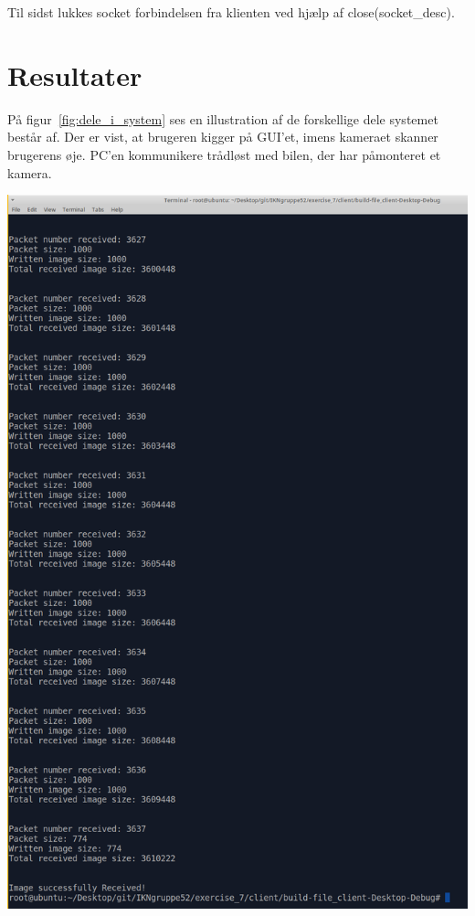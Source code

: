 \documentclass[12pt,fleqn,a4paper]{report}
\begin{document}
Til sidst lukkes socket forbindelsen fra klienten ved hjælp af close(socket\_desc).

\newpage

\chapter{Resultater}

På figur~\ref{fig:dele_i_system} ses en illustration af de forskellige dele systemet består af. Der er vist, at brugeren kigger på GUI’et, imens kameraet skanner brugerens øje. PC’en kommunikere trådløst med bilen, der har påmonteret et kamera.

\begin{center}
	\includegraphics[width=0.9 \textwidth]{klient_stortestfil.png}
	\label{fig:dele_i_system}
\end{center}

\newpage
\end{document}

